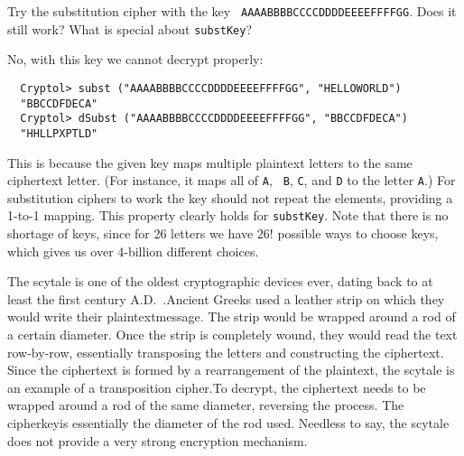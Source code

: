 
\begin{Exercise}\label{ex:subst:3}
  Try the substitution cipher with the key {\tt
    AAAABBBBCCCCDDDDEEEEFFFFGG}. Does it still work?  What is special
  about {\tt substKey}?
\end{Exercise}
\begin{Answer}
No, with this key we cannot decrypt properly:
\begin{Verbatim}
  Cryptol> subst ("AAAABBBBCCCCDDDDEEEEFFFFGG", "HELLOWORLD")
  "BBCCDFDECA"
  Cryptol> dSubst ("AAAABBBBCCCCDDDDEEEEFFFFGG", "BBCCDFDECA")
  "HHLLPXPTLD"
\end{Verbatim}
This is because the given key maps multiple plaintext letters to the
same ciphertext letter. (For instance, it maps all of {\tt A}, {\tt
  B}, {\tt C}, and {\tt D} to the letter {\tt A}.) For substitution
ciphers to work the key should not repeat the elements, providing a
1-to-1 mapping. This property clearly holds for {\tt substKey}. Note
that there is no shortage of keys, since for 26 letters we have 26!
possible ways to choose keys, which gives us over 4-billion different
choices.
\end{Answer}


The scytale is one of the oldest cryptographic devices ever, dating
back to at least the first century
A.D.~\cite{wiki:scytale}.\indScytale Ancient Greeks used a leather
strip on which they would write their plaintext\indPlaintext message.
The strip would be wrapped around a rod of a certain diameter. Once
the strip is completely wound, they would read the text row-by-row,
essentially transposing the letters and constructing the
ciphertext\indCiphertext. Since the ciphertext is formed by a
rearrangement of the plaintext, the scytale is an example of a
transposition cipher.\indTranspositioncipher To decrypt, the
ciphertext needs to be wrapped around a rod of the same diameter,
reversing the process. The cipherkey\indCipherkey is essentially the
diameter of the rod used. Needless to say, the scytale does not
provide a very strong encryption mechanism.

